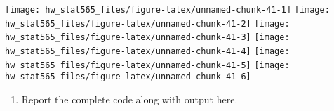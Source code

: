 \documentclass[]{article}
\providecommand{\tightlist}{%
  \setlength{\itemsep}{0pt}\setlength{\parskip}{0pt}}
\begin{document}
\texttt{[image: hw\_stat565\_files/figure-latex/unnamed-chunk-41-1]}
\texttt{[image: hw\_stat565\_files/figure-latex/unnamed-chunk-41-2]}
\texttt{[image: hw\_stat565\_files/figure-latex/unnamed-chunk-41-3]}
\texttt{[image: hw\_stat565\_files/figure-latex/unnamed-chunk-41-4]}
\texttt{[image: hw\_stat565\_files/figure-latex/unnamed-chunk-41-5]}
\texttt{[image: hw\_stat565\_files/figure-latex/unnamed-chunk-41-6]}

\begin{enumerate}
\def\labelenumi{(\alph{enumi})}
\setcounter{enumi}{5}
\tightlist
\item
  Report the complete code along with output here.
\end{enumerate}
\end{document}
